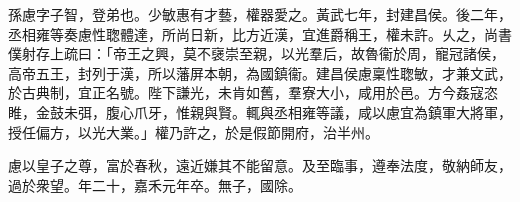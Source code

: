 \begin{pinyinscope}
 
 
 孫慮字子智，登弟也。少敏惠有才藝，權器愛之。黃武七年，封建昌侯。後二年，丞相雍等奏慮性聦體達，所尚日新，比方近漢，宜進爵稱王，權未許。乆之，尚書僕射存上疏曰：「帝王之興，莫不襃崇至親，以光羣后，故魯衞於周，寵冠諸侯，高帝五王，封列于漢，所以藩屏本朝，為國鎮衞。建昌侯慮稟性聦敏，才兼文武，於古典制，宜正名號。陛下謙光，未肯如舊，羣寮大小，咸用於邑。方今姦寇恣睢，金鼓未弭，腹心爪牙，惟親與賢。輒與丞相雍等議，咸以慮宜為鎮軍大將軍，授任偏方，以光大業。」權乃許之，於是假節開府，治半州。
 
 
 慮以皇子之尊，富於春秋，遠近嫌其不能留意。及至臨事，遵奉法度，敬納師友，過於衆望。年二十，嘉禾元年卒。無子，國除。
 
 
\end{pinyinscope}